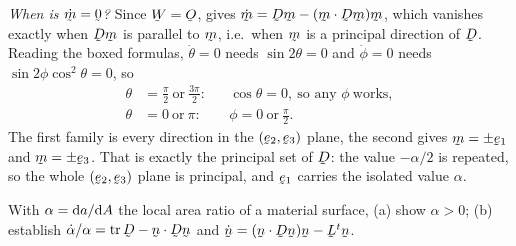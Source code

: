 \begin{solution}
\emph{When is $\dot\bm=\bze$?} Since $\bW=\Ob$,  gives
$\dot\bm=\bD\bm-(\ip\bm{\bD\bm})\bm$, which vanishes exactly when
$\bD\bm$ is parallel to $\bm$, i.e.\ when $\bm$ is a principal direction
of $\bD$. Reading the boxed formulas, $\dot\theta=0$ needs
$\sin2\theta=0$ and $\dot\phi=0$ needs $\sin2\phi\cos^{2}\theta=0$, so
\[
\begin{aligned}
   \theta&=\tfrac\pi2\ \text{or}\ \tfrac{3\pi}{2}:
     &&\cos\theta=0,\ \text{so any }\phi\ \text{works},\\
   \theta&=0\ \text{or}\ \pi: &&\phi=0\ \text{or}\ \tfrac\pi2 .
\end{aligned}
\]
The first family is every direction in the $(\be_{2},\be_{3})$ plane, the
second gives $\bm=\pm\be_{1}$ and $\bm=\pm\be_{3}$. That is exactly the
principal set of $\bD$: the value $-\alpha/2$ is repeated, so the whole
$(\be_{2},\be_{3})$ plane is principal, and $\be_{1}$ carries the isolated
value $\alpha$.
\end{solution}

\begin{problem}
With $\alpha=\mathrm{d} a/\mathrm{d} A$ the local area ratio of a material surface,
(a) show $\alpha>0$; (b) establish
$\dot\alpha/\alpha=\tr\bD-\ip\bn{\bD\bn}$ and
$\dot\bn=(\ip\bn{\bD\bn})\bn-\bL^{t}\bn$.
\end{problem}


